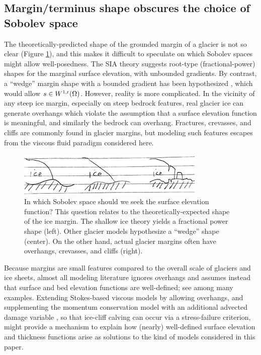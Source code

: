 \documentclass[hidelinks,onefignum,onetabnum,final]{siamart220329}  %
\newcommand{\rr}{{\text{\textnormal{r}}}}
\begin{document}
\subsection{Margin/terminus shape obscures the choice of Sobolev space} \label{subsec:margin}  The theoretically-predicted shape of the grounded margin of a glacier is not so clear (Figure \ref{fig:margins}), and this makes it difficult to speculate on which Sobolev spaces might allow well-posedness.  The SIA theory suggests root-type (fractional-power) shapes \cite{Bueleretal2005} for the marginal surface elevation, with unbounded gradients.  By contrast, a ``wedge'' margin shape with a bounded gradient has been hypothesized \cite[for example]{EchelmeyerKamb1986}, which would allow $s\in W^{1,\rr}(\Omega)$.  However, reality is more complicated.  In the vicinity of any steep ice margin, especially on steep bedrock features, real glacier ice can generate overhangs which violate the assumption that a surface elevation function is meaningful, and similarly the bedrock can overhang.  Fractures, crevasses, and cliffs are commonly found in glacier margins, but modeling such features escapes from the viscous fluid paradigm considered here.

\begin{figure}
\begin{center}
\includegraphics[width=0.8\textwidth]{figs/margins.jpg}
\end{center}
\caption{In which Sobolev space should we seek the surface elevation function?  This question relates to the theoretically-expected shape of the ice margin.  The shallow ice theory yields a fractional power shape (left).  Other glacier models hypothesize a ``wedge'' shape (center).  On the other hand, actual glacier margins often have overhangs, crevasses, and cliffs (right).}
\label{fig:margins}
\end{figure}

Because margins are small features compared to the overall scale of glaciers and ice sheets, almost all modeling literature ignores overhangs and assumes instead that surface and bed elevation functions are well-defined; see \cite{IsaacStadlerGhattas2015,Jouvetetal2008,LofgrenAhlkronaHelanow2022,WirbelJarosch2020} among many examples.  Extending Stokes-based viscous models by allowing overhangs, and supplementing the momentum conservation model with an additional advected damage variable \cite{PralongFunk2005}, so that ice-cliff calving can occur via a stress-failure criterion, might provide a mechanism to explain how (nearly) well-defined surface elevation and thickness functions arise as solutions to the kind of models considered in this paper.
\end{document}

